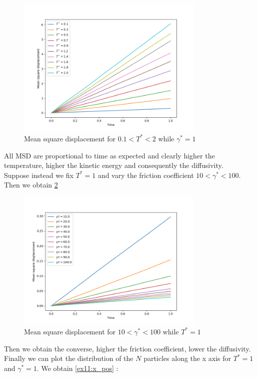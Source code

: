 \begin{figure}[htp]
    \centering
    \includegraphics[width=0.8\textwidth]{FIG/ex11/msd_temp.png}
    \caption{Mean square displacement for $0.1 < T^* < 2$ while $\gamma^* = 1$}
    \label{ex11:msd_temp}
\end{figure}

All MSD are proportional to time as expected and clearly higher the temperature, higher the kinetic energy and consequently the diffusivity. \\
Suppose instead we fix $T^* = 1$ and vary the friction coefficient $10 < \gamma^* < 100 $. Then we obtain \ref{ex11:msd_coeff}

\begin{figure}[htp]
    \centering
    \includegraphics[width=0.8\textwidth]{FIG/ex11/msd_friction.png}
    \caption{Mean square displacement for $10 < \gamma^* < 100$ while $T^* = 1$}
    \label{ex11:msd_coeff}
\end{figure}

Then we obtain the converse, higher the friction coefficient, lower the diffusivity. Finally we can plot the distribution of the $N$ particles along the x axis for
 $T^* = 1$ and $\gamma^* = 1$. We obtain \ref{ex11:x_pos} :

